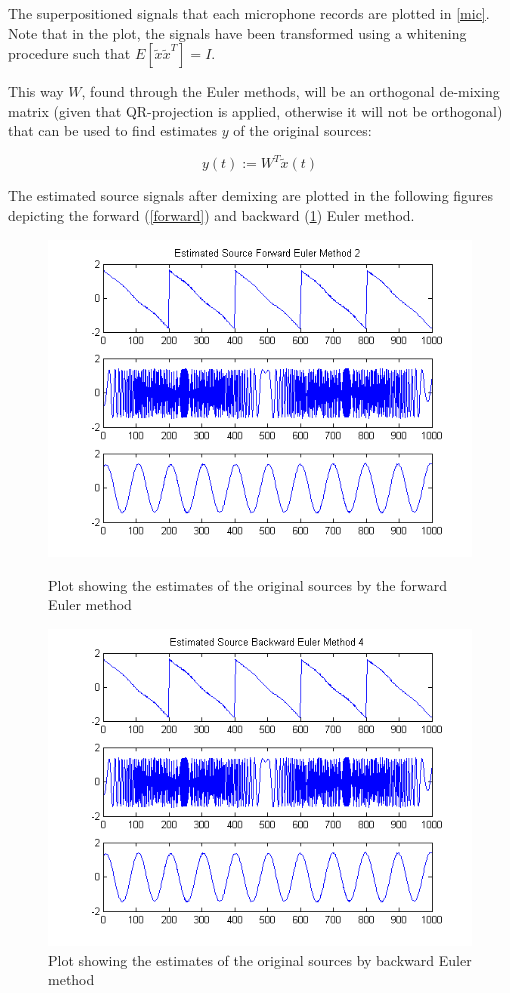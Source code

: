 The superpositioned signals that each microphone records are plotted in \cref{mic}. Note that in the plot, the signals have been transformed using a whitening procedure such that $E[\tilde{x}\tilde{x}^T]=I$. 

This way $W$, found through the Euler methods, will be an orthogonal de-mixing matrix (given that QR-projection is applied, otherwise it will not be orthogonal) that can be used to find estimates $y$ of the original sources:

\begin{equation}
\label{y}
y(t) := W^T\tilde{x}(t)
\end{equation}

The estimated source signals after demixing are plotted in the following figures depicting the forward (\cref{forward}) and backward (\cref{back}) Euler method. 


\begin{figure}[!htbp]
\includegraphics[scale=0.86]{estsignalsforward.png}
\caption{Plot showing the estimates of the original sources by the forward Euler method}
\label{forward}

\includegraphics[scale=0.86]{estsignalsbackward.png}
\caption{Plot showing the estimates of the original sources by backward Euler method}
\label{back}
\end{figure}

